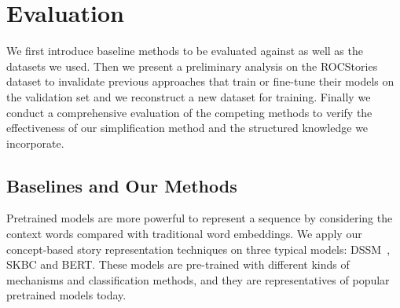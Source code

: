 \section{Evaluation}
\label{sec:experiment}


We first introduce baseline methods to be evaluated against as well as
the datasets we used.
Then we present a preliminary analysis on the ROCStories dataset to invalidate
previous approaches that train or fine-tune their models on the validation
set and we reconstruct a new dataset for training. Finally we conduct a comprehensive
evaluation of the competing methods to verify the effectiveness of our simplification method and 
the structured knowledge we incorporate.

\subsection{Baselines and Our Methods}
\label{sec:baselines}
Pretrained models are more powerful to represent a 
sequence by considering the context words compared with traditional word embeddings. 
We apply our concept-based story representation techniques on three typical 
models: DSSM~\cite{mostafazadeh2016corpus}, SKBC and BERT. 
These models are pre-trained with different kinds of mechanisms
 and classification methods, and they are representatives of popular
pretrained models today. 

